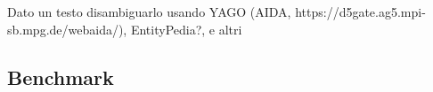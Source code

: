 Dato un testo disambiguarlo usando YAGO (AIDA, https://d5gate.ag5.mpi-sb.mpg.de/webaida/), EntityPedia?, e altri

\subsection{Benchmark}